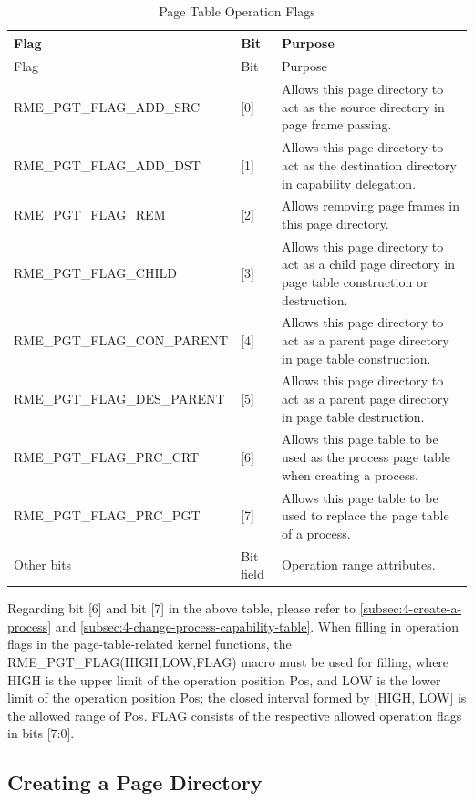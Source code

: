 \begin{xltabular}{\textwidth}{@{}>{\hsize\raggedright\arraybackslash}X>{\hsize\raggedright\arraybackslash}X>{\hsize\raggedright\arraybackslash}X@{}}
\caption{Page Table Operation Flags}\label{tab:3-9-page-table-operation-flags}\\
\toprule
Flag & Bit & Purpose\tabularnewline
\endfirsthead
\toprule
Flag & Bit & Purpose\tabularnewline
\midrule
\endhead
\bottomrule
\endlastfoot
RME\_PGT\_FLAG\_ADD\_SRC & {[}0{]} &
Allows this page directory to act as the source directory in page frame passing.\tabularnewline
RME\_PGT\_FLAG\_ADD\_DST & {[}1{]} &
Allows this page directory to act as the destination directory in capability delegation.\tabularnewline
RME\_PGT\_FLAG\_REM & {[}2{]} &
Allows removing page frames in this page directory.\tabularnewline
RME\_PGT\_FLAG\_CHILD & {[}3{]} &
Allows this page directory to act as a child page directory in page table construction or destruction.\tabularnewline
RME\_PGT\_FLAG\_CON\_PARENT & {[}4{]} &
Allows this page directory to act as a parent page directory in page table construction.\tabularnewline
RME\_PGT\_FLAG\_DES\_PARENT & {[}5{]} &
Allows this page directory to act as a parent page directory in page table destruction.\tabularnewline
RME\_PGT\_FLAG\_PRC\_CRT & {[}6{]} &
Allows this page table to be used as the process page table when creating a process.\tabularnewline
RME\_PGT\_FLAG\_PRC\_PGT & {[}7{]} &
Allows this page table to be used to replace the page table of a process.\tabularnewline
Other bits & Bit field & Operation range attributes.\tabularnewline
\end{xltabular}
\nopagebreak[4]

Regarding bit {[}6{]} and bit {[}7{]} in the above table, please refer to \ref{subsec:4-create-a-process} and \ref{subsec:4-change-process-capability-table}. When filling in operation flags in the page-table-related kernel functions, the RME\_PGT\_FLAG(HIGH,LOW,FLAG) macro must be used for filling, where HIGH is the upper limit of the operation position Pos, and LOW is the lower limit of the operation position Pos; the closed interval formed by [HIGH, LOW] is the allowed range of Pos. FLAG consists of the respective allowed operation flags in bits {[}7:0{]}.

\subsection{Creating a Page Directory}\label{subsec:3-create-page-directory}

